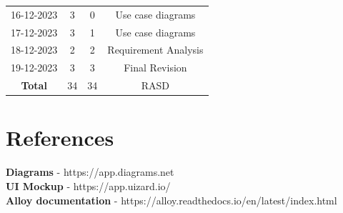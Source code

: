 \documentclass[12pt, a4paper]{report}
\begin{document}
\begin{table}[H]
\begin{tabular}{cccc}
            16-12-2023      & 3                         & 0                             & Use case diagrams                             \\
            17-12-2023      & 3                         & 1                             & Use case diagrams                             \\
            18-12-2023      & 2                         & 2                             & Requirement Analysis                          \\
            19-12-2023      & 3                         & 3                             & Final Revision                                \\ \hline
            \textbf{Total}  & 34                        & 34                            & RASD                                          \\  
        \end{tabular}
    \end{table}

\chapter{References}
    \textbf{Diagrams} - https://app.diagrams.net
    \\
    \textbf{UI Mockup} - https://app.uizard.io/
    \\
    \textbf{Alloy documentation} - https://alloy.readthedocs.io/en/latest/index.html
\end{document}
